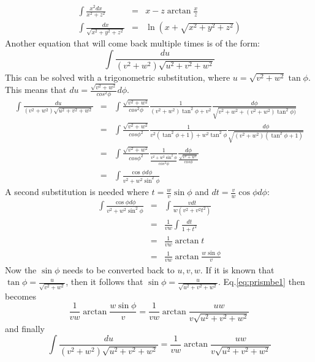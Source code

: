 \begin{eqnarray}
\int \frac{x^2 dx}{x^2 + z^2} &=& x - z  \arctan{\frac{x}{z}} \label{eq:basic1} \\
\int \frac{dx}{\sqrt{x^2+y^2+z^2}} &=& \ln{\left( x + \sqrt{x^2+y^2+z^2} \right)} \label{eq:basic2}
\end{eqnarray}
Another equation that will come back multiple times is of the form:
\begin{equation}
\int \frac{du}{(v^2+w^2)\sqrt{u^2+v^2+w^2}}
\end{equation}
This can be solved with a trigonometric substitution, where $u = \sqrt{v^2+w^2} \tan{\phi}$. This means that $du = \frac{\sqrt{v^2+w^2}}{cos^2{\phi}} d\phi$.
\begin{eqnarray}
\int \frac{du}{(v^2+w^2)\sqrt{u^2+v^2+w^2}} 
&=& 
\int \frac{\sqrt{v^2+w^2}}{cos^2{\phi}} 
\frac{1}{(v^2+w^2)\tan^2{\phi}+v^2} 
\frac{d\phi}{\sqrt{v^2+w^2+(v^2+w^2)\tan^2{\phi})}} \nonumber\\
&=& 
\int \frac{\sqrt{v^2+w^2}}{cos{\phi}^2} 
\frac{1}{v^2(\tan^2{\phi}+1) + w^2 \tan^2{\phi}} 
\frac{d\phi}{\sqrt{(v^2+w^2)(\tan^2{\phi}+1)}} \nonumber\\
&=&
\int \frac{\sqrt{v^2+w^2}}{cos{\phi}^2} 
\frac{1}{\frac{v^2+w^2 \sin^2{\phi}}{cos^2{\phi}}} 
\frac{d\phi}{\frac{\sqrt{v^2+w^2}}{cos{\phi}}} \nonumber\\
&=& 
\int \frac{\cos{\phi} d\phi}{v^2+w^2\sin^2{\phi}}
\end{eqnarray}
A second substitution is needed where $t = \frac{w}{v}\sin{\phi}$ and $dt = \frac{v}{w} \cos{\phi} d\phi$:
\begin{eqnarray}
\int \frac{\cos{\phi} d\phi}{v^2+w^2\sin^2{\phi}} 
&=& \int \frac{v dt}{w (v^2+v^2t^2)} \nonumber\\
&=& \frac{1}{vw} \int \frac{dt}{1+t^2} \nonumber\\
&=& \frac{1}{vw} \arctan{t} \nonumber\\
&=& \frac{1}{vw} \arctan{\frac{w \sin{\phi}}{v}} \label{eq:prismbe1}
\end{eqnarray}
Now the $\sin{\phi}$ needs to be converted back to $u,v,w$. If it is known that $\tan{\phi} = \frac{u}{\sqrt{v^2+w^2}}$, then it follows that $\sin{\phi}=\frac{u}{\sqrt{u^2+v^2+w^2}}$.
Eq.\eqref{eq:prismbe1} then becomes
\begin{equation}
{\frac{1}{vw} \arctan \frac{w \sin{\phi}}{v}} = \frac{1}{vw} \arctan{\frac{u w}{v \sqrt{u^2+v^2+w^2}}}
\end{equation}
and finally 
\begin{equation}
\boxed{
\int \frac{du}{(v^2+w^2)\sqrt{u^2+v^2+w^2}} = \frac{1}{vw} \arctan{\frac{u w}{v \sqrt{u^2+v^2+w^2}}} \label{eq:basic3}
}
\end{equation}

